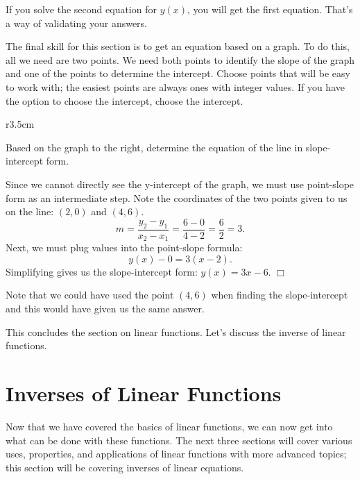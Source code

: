 \documentclass[../book.tex]{subfiles}
\begin{document}
\begin{remark}
If you solve the second equation for $y(x)$, you will get the first equation.  That's a way of validating your answers.
\end{remark}
The final skill for this section is to get an equation based on a graph.  To do this, all we need are two points.  We need both points to identify the slope of the graph and one of the points to determine the intercept.  Choose points that will be easy to work with; the easiest points are always ones with integer values.  If you have the option to choose the intercept, choose the intercept.
\begin{wrapfigure}{r}{3.5cm}
\end{wrapfigure}
\begin{example}
Based on the graph to the right, determine the equation of the line in slope-intercept form.
\end{example}
\begin{solution}
Since we cannot directly see the y-intercept of the graph, we must use point-slope form as an intermediate step.  Note the coordinates of the two points given to us on the line: $(2,0)$ and $(4,6)$.  $$m=\dfrac{y_2-y_1}{x_2-x_1}=\dfrac{6-0}{4-2}=\dfrac{6}{2}=3.$$
Next, we must plug values into the point-slope formula: $$y(x)-0=3(x-2).$$
Simplifying gives us the slope-intercept form: $y(x)=3x-6$.  $\Box$
\end{solution}
\begin{remark}
Note that we could have used the point $(4,6)$ when finding the slope-intercept and this would have given us the same answer.
\end{remark}

This concludes the section on linear functions.  Let's discuss the inverse of linear functions.
\section{Inverses of Linear Functions}
Now that we have covered the basics of linear functions, we can now get into what can be done with these functions.  The next three sections will cover various uses, properties, and applications of linear functions with more advanced topics; this section will be covering inverses of linear equations.  
\end{document}
